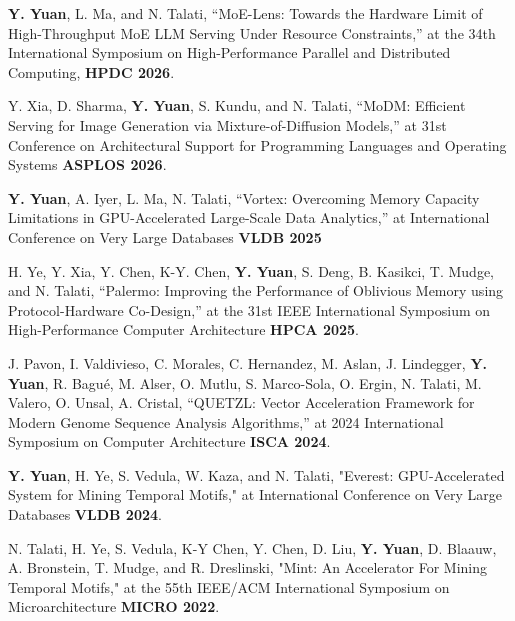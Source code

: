 \documentclass[10pt, letterpaper]{article}
\begin{document}
        \textbf{Y. Yuan}, L. Ma, and N. Talati, “MoE-Lens: Towards the Hardware Limit of High-Throughput MoE LLM Serving Under Resource Constraints,” at the 34th International Symposium on High-Performance Parallel and Distributed Computing, \textbf{HPDC 2026}.

        \vspace{0.25cm}

        Y. Xia, D. Sharma, \textbf{Y. Yuan}, S. Kundu, and N. Talati, “MoDM: Efficient Serving for Image Generation via Mixture-of-Diffusion Models,”  at 31st Conference on Architectural Support for Programming Languages and Operating Systems \textbf{ASPLOS 2026}.
        
        \vspace{0.25cm}

        \textbf{Y. Yuan}, A. Iyer, L. Ma, N. Talati, ``Vortex: Overcoming Memory Capacity Limitations in GPU-Accelerated Large-Scale Data Analytics,'' at International Conference on Very Large Databases \textbf{VLDB 2025}

        \vspace{0.25cm}

        H. Ye, Y. Xia, Y. Chen, K-Y. Chen, \textbf{Y. Yuan}, S. Deng, B. Kasikci, T. Mudge, and N. Talati, ``Palermo: Improving the Performance of Oblivious Memory using Protocol-Hardware Co-Design,'' at the 31st IEEE International Symposium on High-Performance Computer Architecture \textbf{HPCA 2025}.
        
        \vspace{0.25cm}

        J. Pavon, I. Valdivieso, C. Morales, C. Hernandez, M. Aslan, J. Lindegger, \textbf{Y. Yuan}, R. Bagué, M. Alser, O. Mutlu, S. Marco-Sola, O. Ergin, N. Talati, M. Valero, O. Unsal, A. Cristal, ``QUETZL: Vector Acceleration Framework for Modern Genome Sequence Analysis Algorithms,'' at 2024 International Symposium on Computer Architecture \textbf{ISCA 2024}.

        \vspace{0.25cm}

        \textbf{Y. Yuan}, H. Ye, S. Vedula, W. Kaza, and N. Talati, "Everest: GPU-Accelerated System for Mining Temporal Motifs," at International Conference on Very Large Databases \textbf{VLDB 2024}.

        \vspace{0.25cm}

         N. Talati, H. Ye, S. Vedula, K-Y Chen, Y. Chen, D. Liu, \textbf{Y. Yuan}, D. Blaauw, A. Bronstein, T. Mudge, and R. Dreslinski, "Mint: An Accelerator For Mining Temporal Motifs," at the 55th IEEE/ACM International Symposium on Microarchitecture \textbf{MICRO 2022}.
\end{document}
